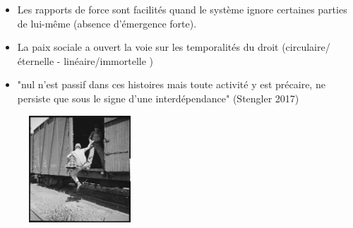 \documentclass[newPxFont]{beamer}
\begin{document}
\begin{frame}[c]{}
\vspace{-1cm}
\begin{itemize}
    \item Les rapports de force sont facilités quand le système ignore certaines parties de lui-même (absence d'émergence forte).
    \item La paix sociale a ouvert la voie sur les temporalités du droit (circulaire/éternelle - linéaire/immortelle )
    \item "nul n'est passif dans ces histoires mais toute activité y est précaire, ne persiste que sous le signe d'une interdépendance" (Stengler 2017)
\end{itemize}

\begin{figure}
  \includegraphics[height=4cm]{img/valeurs.jpg}
\end{figure}


\end{frame}
\end{document}
